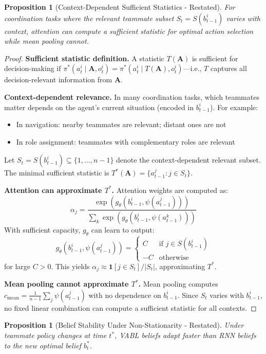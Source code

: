 \documentclass{article}
\theoremstyle{plain}
\newtheorem{proposition}[theorem]{Proposition}
\theoremstyle{definition}
\theoremstyle{remark}
\begin{document}
\begin{proposition}[Context-Dependent Sufficient Statistics - Restated]
For coordination tasks where the relevant teammate subset $S_t = S(b_{t-1}^i)$ varies with context, attention can compute a sufficient statistic for optimal action selection while mean pooling cannot.
\end{proposition}

\begin{proof}
\textbf{Sufficient statistic definition.}
A statistic $T(\mathbf{A})$ is sufficient for decision-making if $\pi^*(a_t^i \mid \mathbf{A}, o_t^i) = \pi^*(a_t^i \mid T(\mathbf{A}), o_t^i)$---i.e., $T$ captures all decision-relevant information from $\mathbf{A}$.

\textbf{Context-dependent relevance.}
In many coordination tasks, which teammates matter depends on the agent's current situation (encoded in $b_{t-1}^i$). For example:
\begin{itemize}
\item In navigation: nearby teammates are relevant; distant ones are not
\item In role assignment: teammates with complementary roles are relevant
\end{itemize}

Let $S_t = S(b_{t-1}^i) \subseteq \{1, \ldots, n-1\}$ denote the context-dependent relevant subset. The minimal sufficient statistic is $T^*(\mathbf{A}) = \{a_{t-1}^j : j \in S_t\}$.

\textbf{Attention can approximate $T^*$.}
Attention weights are computed as:
\[
\alpha_j = \frac{\exp(g_\theta(b_{t-1}^i, \psi(a_{t-1}^j)))}{\sum_k \exp(g_\theta(b_{t-1}^i, \psi(a_{t-1}^k)))}
\]
With sufficient capacity, $g_\theta$ can learn to output:
\[
g_\theta(b_{t-1}^i, \psi(a_{t-1}^j)) = \begin{cases} C & \text{if } j \in S(b_{t-1}^i) \\ -C & \text{otherwise} \end{cases}
\]
for large $C > 0$. This yields $\alpha_j \approx \mathbf{1}[j \in S_t] / |S_t|$, approximating $T^*$.

\textbf{Mean pooling cannot approximate $T^*$.}
Mean pooling computes $c_{\mathrm{mean}} = \frac{1}{n-1}\sum_j \psi(a_{t-1}^j)$ with no dependence on $b_{t-1}^i$. Since $S_t$ varies with $b_{t-1}^i$, no fixed linear combination can compute a sufficient statistic for all contexts.
\end{proof}

\begin{proposition}[Belief Stability Under Non-Stationarity - Restated]
Under teammate policy changes at time $t^*$, VABL beliefs adapt faster than RNN beliefs to the new optimal belief $b_t^*$.
\end{proposition}
\end{document}
